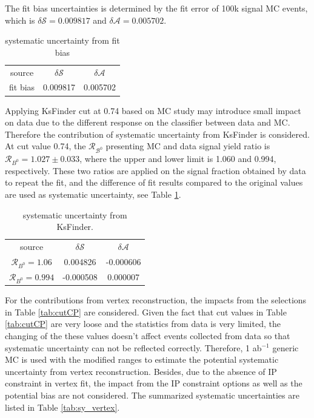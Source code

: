 The fit bias uncertainties is determined by the fit error of 100k signal MC events, which is $\delta {\mathcal{S}}=0.009817$ and $\delta {\mathcal{A}}=0.005702$.
\begin{table}[H]
	\begin{minipage}[b]{1.0\linewidth}
		\centering
		\caption{systematic uncertainty from fit bias}
		\begin{tabular}{c c c}
			\hline
			source & $\delta \mathcal{S}$ & $\delta \mathcal{A}$ \\
			fit bias & 0.009817 & 0.005702\\
			\hline
		\end{tabular}
	\end{minipage}
\end{table}

Applying KsFinder cut at 0.74 based on MC study may introduce small impact on data due to the different response on the classifier between data and MC. Therefore the contribution of systematic uncertainty from KsFinder is considered. At cut value  0.74, the $\mathcal{R_{B^0}}$ presenting MC and data signal yield ratio is $\mathcal{R}_{B^0} = 1.027 \pm 0.033$, where the upper and lower limit is 1.060 and 0.994, respectively. These two ratios are applied on the signal fraction obtained by data to repeat the fit, and the difference of fit results compared to the original values are used as systematic uncertainty, see Table \ref{tab:sy_ks}.

\begin{table}[H]
	\begin{minipage}[b]{1.0\linewidth}
		\centering
		\caption{systematic uncertainty from KsFinder.}
		\label{tab:sy_ks}
		\begin{tabular}{c c c}
			\hline
			source & $\delta \mathcal{S}$ & $\delta \mathcal{A}$ \\
			$\mathcal{R}_{B^0}=1.06$ & 0.004826
 & -0.000606\\
			$\mathcal{R}_{B^0}=0.994$ & -0.000508
& 0.000007
\\
			\hline
		\end{tabular}
	\end{minipage}
\end{table}

For the contributions from vertex reconstruction, the impacts from the selections in Table \ref{tab:cutCP} are considered. Given the fact that cut values in Table \ref{tab:cutCP} are very loose and the statistics from data is very limited, the changing of the these values doesn't affect events collected from data so that systematic uncertainty can not be reflected correctly. Therefore, 1 ab$^{-1}$ generic MC is used with the modified ranges to estimate the potential systematic uncertainty from vertex reconstruction. Besides, due to the absence of IP constraint in vertex fit, the impact from the IP constraint options as well as the potential bias are not considered. The summarized systematic uncertainties are listed in Table \ref{tab:sy_vertex}.

